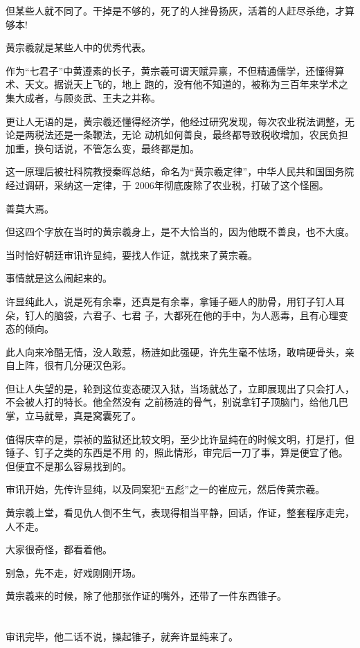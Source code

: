 \documentclass[11pt,a4paper,onecolumn]{article}
\begin{document}
但某些人就不同了。干掉是不够的，死了的人挫骨扬灰，活着的人赶尽杀绝，才算够本!

黄宗羲就是某些人中的优秀代表。

作为``七君子''中黄遵素的长子，黄宗羲可谓天赋异禀，不但精通儒学，还懂得算术、天文。据说天上飞的，地上
跑的，没有他不知道的，被称为三百年来学术之集大成者，与顾炎武、王夫之并称。

更让人无语的是，黄宗羲还懂得经济学，他经过研究发现，每次农业税法调整，无论是两税法还是一条鞭法，无论
动机如何善良，最终都导致税收增加，农民负担加重，换句话说，不管怎么变，最终都是加。

这一原理后被社科院教授秦晖总结，命名为``黄宗羲定律''，中华人民共和国国务院经过调研，采纳这一定律，于
2006年彻底废除了农业税，打破了这个怪圈。

善莫大焉。

但这四个字放在当时的黄宗羲身上，是不大恰当的，因为他既不善良，也不大度。

当时恰好朝廷审讯许显纯，要找人作证，就找来了黄宗羲。

事情就是这么闹起来的。

许显纯此人，说是死有余辜，还真是有余辜，拿锤子砸人的肋骨，用钉子钉人耳朵，钉人的脑袋，六君子、七君
子，大都死在他的手中，为人恶毒，且有心理变态的倾向。

此人向来冷酷无情，没人敢惹，杨涟如此强硬，许先生毫不怯场，敢啃硬骨头，亲自上阵，很有几分硬汉色彩。

但让人失望的是，轮到这位变态硬汉入狱，当场就怂了，立即展现出了只会打人，不会被人打的特长。他全然没有
之前杨涟的骨气，别说拿钉子顶脑门，给他几巴掌，立马就晕，真是窝囊死了。

值得庆幸的是，崇祯的监狱还比较文明，至少比许显纯在的时候文明，打是打，但锤子、钉子之类的东西是不用
的，照此情形，审完后一刀了事，算是便宜了他。但便宜不是那么容易找到的。

审讯开始，先传许显纯，以及同案犯``五彪''之一的崔应元，然后传黄宗羲。

黄宗羲上堂，看见仇人倒不生气，表现得相当平静，回话，作证，整套程序走完，人不走。

大家很奇怪，都看着他。

别急，先不走，好戏刚刚开场。

黄宗羲来的时候，除了他那张作证的嘴外，还带了一件东西\myrule 锥子。

\section[\thesection]{}

审讯完毕，他二话不说，操起锥子，就奔许显纯来了。
\end{document}

